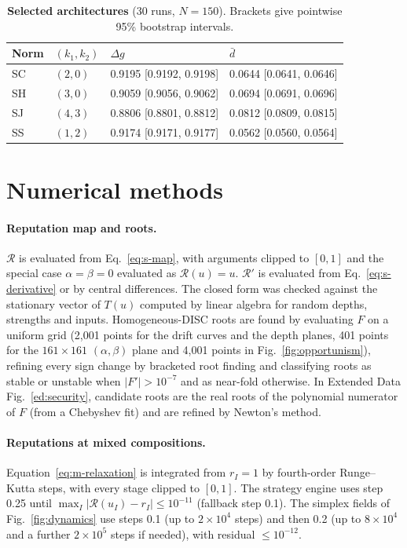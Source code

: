 \documentclass[fleqn,10pt]{wlscirep}
\newcommand{\Rmap}{\mathscr{R}}            %
\theoremstyle{plain}
\begin{document}
\begin{table}[!htbp]
\centering
\caption{\textbf{Selected architectures} (30 runs, $N=150$). Brackets give pointwise 95\% bootstrap intervals.}
\label{tab:si-selected}
\small
\begin{tabular}{@{}llll@{}}
\toprule
Norm & $(k_1,k_2)$ & $\Delta g$ & $\bar d$\\
\midrule
SC & $(2,0)$ & 0.9195 [0.9192, 0.9198] & 0.0644 [0.0641, 0.0646]\\
SH & $(3,0)$ & 0.9059 [0.9056, 0.9062] & 0.0694 [0.0691, 0.0696]\\
SJ & $(4,3)$ & 0.8806 [0.8801, 0.8812] & 0.0812 [0.0809, 0.0815]\\
SS & $(1,2)$ & 0.9174 [0.9171, 0.9177] & 0.0562 [0.0560, 0.0564]\\
\bottomrule
\end{tabular}
\end{table}

\section{Numerical methods}
\label{si:numerics}

\paragraph{Reputation map and roots.} $\Rmap$ is evaluated from Eq.~\eqref{eq:s-map}, with arguments clipped to $[0,1]$ and the special case $\alpha=\beta=0$ evaluated as $\Rmap(u)=u$. $\Rmap'$ is evaluated from Eq.~\eqref{eq:s-derivative} or by central differences. The closed form was checked against the stationary vector of $T(u)$ computed by linear algebra for random depths, strengths and inputs. Homogeneous-DISC roots are found by evaluating $F$ on a uniform grid (2,001 points for the drift curves and the depth planes, 401 points for the $161\times161$ $(\alpha,\beta)$ plane and 4,001 points in Fig.~\ref{fig:opportunism}), refining every sign change by bracketed root finding and classifying roots as stable or unstable when $|F'|>10^{-7}$ and as near-fold otherwise. In Extended Data Fig.~\ref{ed:security}, candidate roots are the real roots of the polynomial numerator of $F$ (from a Chebyshev fit) and are refined by Newton's method.

\paragraph{Reputations at mixed compositions.} Equation~\eqref{eq:m-relaxation} is integrated from $r_I=1$ by fourth-order Runge--Kutta steps, with every stage clipped to $[0,1]$. The strategy engine uses step 0.25 until $\max_I|\Rmap(u_I)-r_I|\leq10^{-11}$ (fallback step 0.1). The simplex fields of Fig.~\ref{fig:dynamics} use steps 0.1 (up to $2\times10^4$ steps) and then 0.2 (up to $8\times10^4$ and a further $2\times10^5$ steps if needed), with residual $\leq10^{-12}$.
\end{document}
